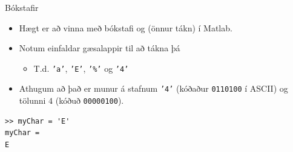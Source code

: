 \documentclass{beamer}
\begin{document}
\begin{frame}[fragile]{Bókstafir}
\begin{itemize}
 \item Hægt er að vinna með bókstafi og (önnur tákn) í Matlab.
 \item Notum einfaldar gæsalappir til að tákna þá
 \begin{itemize}
  \item T.d. \texttt{'a'}, \texttt{'E'}, \texttt{'\%'} og \texttt{'4'}
 \end{itemize}
 \item Athugum að það er munur á stafnum \texttt{'4'} (kóðaður \texttt{0110100} í ASCII) og tölunni $4$ (kóðuð \texttt{00000100}).
\end{itemize}
\begin{verbatim}
>> myChar = 'E'
myChar =
E
\end{verbatim}
\end{frame}
\end{document}
